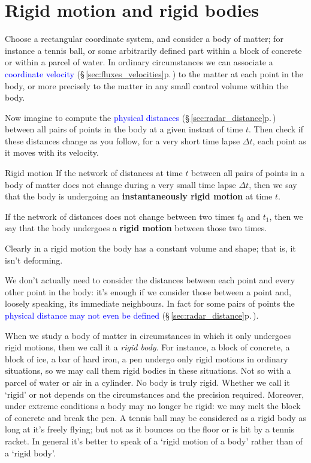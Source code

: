 \documentclass[a4paper,12pt,%
onecolumn,oneside,%
british%
]{memoir}
\newcommand*{\incr}{\Delta}%
\renewcommand*{\|}[1][]{\nonscript\:#1\vert\nonscript\:\mathopen{}}
\newcommand*{\sect}{\S}%
\renewcommand*{\autoref}[3][\sect\,\ref]{\textcolor{blue}{#3} {\color{blue}\scriptsize(\faIcon[regular]{eye}\;#1{#2}\;p.\,\pageref{#2})}}
\newcommand*{\yti}{t_{0}}
\newcommand*{\ytf}{t_{1}}
\newcommand*{\Dt}{\incr t}
\begin{document}
\section{Rigid motion and rigid bodies}
\label{sec:rigid_bodies}

Choose a rectangular coordinate system, and consider a body of matter; for instance a tennis ball, or some arbitrarily defined part within a block of concrete or within a parcel of water. In ordinary circumstances we can associate a \autoref{sec:fluxes_velocities}{coordinate velocity} to the matter at each point in the body, or more precisely to the matter in any small control volume within the body.

Now imagine to compute the \autoref{sec:radar_distance}{physical distances} between all pairs of points in the body at a given instant of time $t$. Then check if these distances change as you follow, for a very short time lapse $\Dt$,  each point as it moves with its velocity.
%
\begin{definition}{Rigid motion}\label{def:rigid_motion}
  If the network of distances at time $t$ between all pairs of points in a body of matter does not change during a very small time lapse $\Dt$, then we say that  the body is undergoing an \textbf{instantaneously rigid motion} at time $t$.

  \smallskip

  If the network of distances does not change between two times $\yti$ and $\ytf$, then we say that the body undergoes a \textbf{rigid motion} between those two times.
\end{definition}
Clearly in a rigid motion the body has a constant volume and shape; that is, it isn't deforming.

We don't actually need to consider the distances between each point and every other point in the body: it's enough if we consider those between a point and, loosely speaking, its immediate neighbours. In fact for some pairs of points the \autoref{sec:radar_distance}{physical distance may not even be defined}.

When we study a body of matter in circumstances in which it only undergoes rigid motions, then we call it a \emph{rigid body}. For instance, a block of concrete, a block of ice, a bar of hard iron, a pen undergo only rigid motions in ordinary situations, so we may call them rigid bodies in these situations. Not so with a parcel of water or air in a cylinder. No body is truly rigid. Whether we call it \enquote*{rigid} or not depends on the circumstances and the precision required. Moreover, under extreme conditions a body may no longer be rigid: we may melt the block of concrete and break the pen. A tennis ball may be considered as a rigid body as long at it's freely flying; but not as it bounces on the floor or is hit by a tennis racket. In general it's better to speak of a \enquote*{rigid motion of a body} rather than of a \enquote*{rigid body}.
\end{document}
